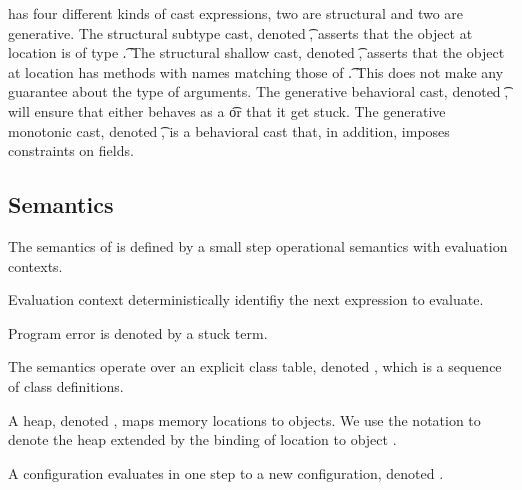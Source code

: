 \documentclass[a4paper,USenglish]{tex/lipics-v2016}
\begin{document}


\kafka has four different kinds of cast expressions, two are structural and
two are generative. The structural subtype cast, denoted \SubCast\t\a,
asserts that the object at location \a is of type \t.  The structural
shallow cast, denoted \ShaCast\t\a, asserts that the object at location \a
has methods with names matching those of \t. This does not make any
guarantee about the type of arguments.  The generative behavioral cast,
denoted \BehCast\t\a, will ensure that either \a behaves as a \t or that it
get stuck. The generative monotonic cast, denoted \MonCast\t\a, is a
behavioral cast that, in addition, imposes constraints on fields.


\subsection{Semantics}


The semantics of \kafka is defined by a small step operational semantics with
evaluation contexts.

Evaluation context deterministically identifiy the next expression to evaluate.

Program error is denoted by a stuck term.

The semantics operate over an explicit class table, denoted \K, which is a
sequence of class definitions.

A heap, denoted \s, maps memory locations to
objects. We use the notation \Map\s{\Bind\a{\obj\C{\b\a}}} to denote the
heap \s extended by the binding of location \a to object \obj\C{\b\a}.

A configuration \K\e\s evaluates in one step to a new configuration, denoted
\Reduce \K\e\s \Kp\ep\sp.
\end{document}

